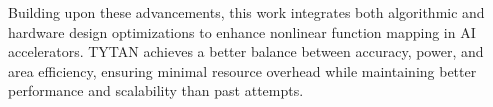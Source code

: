 \documentclass[runningheads]{llncs}
\begin{document}
Building upon these advancements, this work integrates both algorithmic and hardware design optimizations to enhance nonlinear function mapping in AI accelerators. TYTAN achieves a better balance between accuracy, power, and area efficiency, ensuring minimal resource overhead while maintaining better performance and scalability than past attempts.

    
\end{document}
